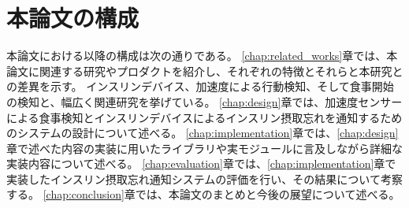 \section{本論文の構成}
\label{section:structure}
本論文における以降の構成は次の通りである。
\ref{chap:related_works}章では、本論文に関連する研究やプロダクトを紹介し、それぞれの特徴とそれらと本研究との差異を示す。
インスリンデバイス、加速度による行動検知、そして食事開始の検知と、幅広く関連研究を挙げている。
\ref{chap:design}章では、加速度センサーによる食事検知とインスリンデバイスによるインスリン摂取忘れを通知するためのシステムの設計について述べる。
\ref{chap:implementation}章では、\ref{chap:design}章で述べた内容の実装に用いたライブラリや実モジュールに言及しながら詳細な実装内容について述べる。
\ref{chap:evaluation}章では、\ref{chap:implementation}章で実装したインスリン摂取忘れ通知システムの評価を行い、その結果について考察する。
\ref{chap:conclusion}章では、本論文のまとめと今後の展望について述べる。
